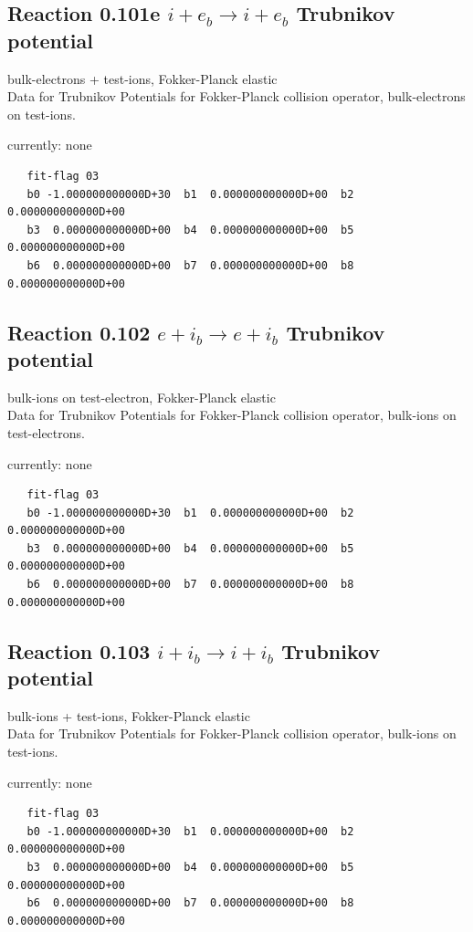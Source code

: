 \documentclass[12pt,dvipdfmx]{article}
\begin{document}
\subsection{
Reaction 0.101e $ i + e_b \rightarrow i + e_b$ Trubnikov potential}
bulk-electrons + test-ions, Fokker-Planck elastic \\
Data for Trubnikov Potentials for Fokker-Planck collision
operator, bulk-electrons on test-ions.

currently: none


\begin{small}\begin{verbatim}
   fit-flag 03
   b0 -1.000000000000D+30  b1  0.000000000000D+00  b2  0.000000000000D+00
   b3  0.000000000000D+00  b4  0.000000000000D+00  b5  0.000000000000D+00
   b6  0.000000000000D+00  b7  0.000000000000D+00  b8  0.000000000000D+00
\end{verbatim}\end{small}

\subsection{
Reaction 0.102 $ e + i_b \rightarrow e + i_b$ Trubnikov potential}
bulk-ions on test-electron, Fokker-Planck elastic \\
Data for Trubnikov Potentials for Fokker-Planck collision
operator, bulk-ions on test-electrons.


currently: none

\begin{small}\begin{verbatim}
   fit-flag 03
   b0 -1.000000000000D+30  b1  0.000000000000D+00  b2  0.000000000000D+00
   b3  0.000000000000D+00  b4  0.000000000000D+00  b5  0.000000000000D+00
   b6  0.000000000000D+00  b7  0.000000000000D+00  b8  0.000000000000D+00
\end{verbatim}\end{small}

\subsection{
Reaction 0.103 $ i + i_b \rightarrow i + i_b$ Trubnikov potential}
bulk-ions + test-ions, Fokker-Planck elastic \\
Data for Trubnikov Potentials for Fokker-Planck collision
operator, bulk-ions on test-ions.

currently: none

\begin{small}\begin{verbatim}
   fit-flag 03
   b0 -1.000000000000D+30  b1  0.000000000000D+00  b2  0.000000000000D+00
   b3  0.000000000000D+00  b4  0.000000000000D+00  b5  0.000000000000D+00
   b6  0.000000000000D+00  b7  0.000000000000D+00  b8  0.000000000000D+00
\end{verbatim}\end{small}
\end{document}
